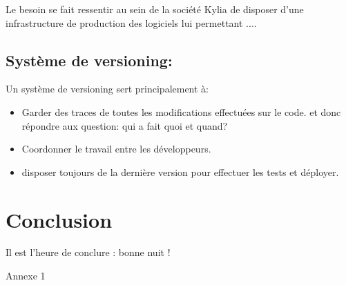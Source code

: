 \documentclass{themeensg}
\begin{document}

Le besoin se fait ressentir au sein de la société Kylia de disposer d'une infrastructure de production des logiciels lui permettant ....

\section{Système de versioning:}
Un système de versioning sert principalement à:
\begin{itemize}
\item Garder des traces de toutes les modifications effectuées sur le code. et donc répondre aux question: qui a fait quoi et quand?
\item Coordonner le travail entre les développeurs.
\item disposer toujours de la dernière version pour effectuer les tests et déployer.

\end{itemize}

\newevenpage
\chapter*{Conclusion}
  \vspace{1.5cm}
Il est l'heure de conclure : bonne nuit !


\newevenpage
\nocite{*}



\newevenpage
\begin{appendices} 
\label{beginappendices}
\label{annexekalman}
Annexe 1

\end{appendices} 
\end{document}
